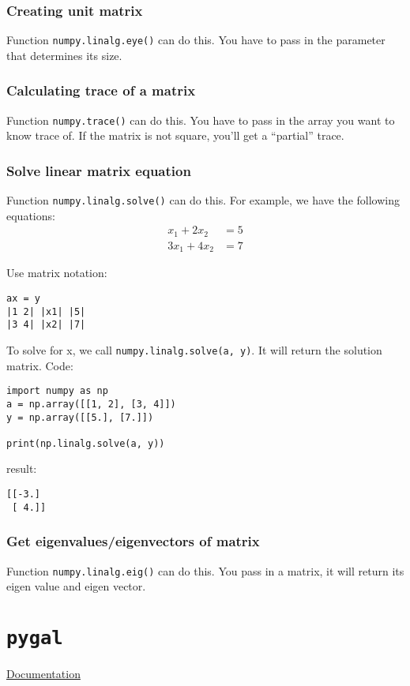 \documentclass[12pt]{book}
\begin{document}
\subsection{Creating unit matrix}
\label{sec:org4416f1e}
Function \texttt{numpy.linalg.eye()} can do this. You have to pass in the parameter that determines its size.
\subsection{Calculating trace of a matrix}
\label{sec:orgb93354d}
Function \texttt{numpy.trace()} can do this. You have to pass in the array you want to know trace of. If the matrix is not square, you'll get a ``partial'' trace.
\subsection{Solve linear matrix equation}
\label{sec:org46b20bc}
Function \texttt{numpy.linalg.solve()} can do this. For example, we have the following equations:
\begin{align*}
x_1 + 2x_2 &= 5 \\
3x_1 + 4x_2 &= 7
\end{align*}

Use matrix notation:
\begin{verbatim}
ax = y
|1 2| |x1| |5|
|3 4| |x2| |7|
\end{verbatim}

To solve for x, we call \texttt{numpy.linalg.solve(a, y)}. It will return the solution matrix. Code:
\begin{verbatim}
import numpy as np
a = np.array([[1, 2], [3, 4]])
y = np.array([[5.], [7.]])

print(np.linalg.solve(a, y))
\end{verbatim}
result:
\begin{verbatim}
[[-3.]
 [ 4.]]
\end{verbatim}
\subsection{Get eigenvalues/eigenvectors of matrix}
\label{sec:orgce6bf3c}
Function \texttt{numpy.linalg.eig()} can do this. You pass in a matrix, it will return its eigen value and eigen vector.

\chapter{\texttt{pygal}}
\label{sec:org0bc1bd1}
\href{http://pygal.org/en/stable/documentation/index.html}{Documentation}
\end{document}
